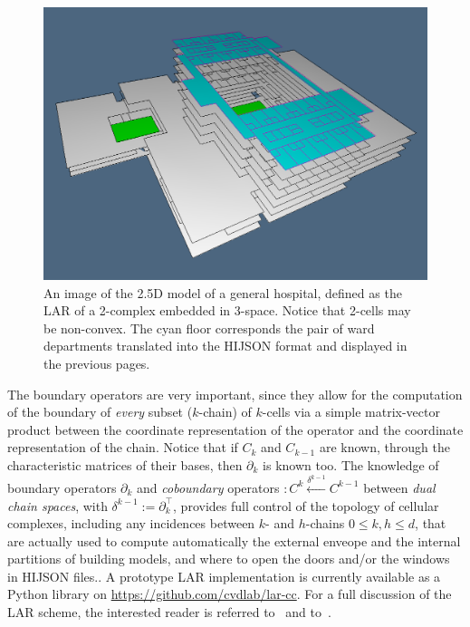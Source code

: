 \begin{figure}[ptb] %
 \centering
 \includegraphics[width=\linewidth]{images/hospital2} 
 \caption{An image of the 2.5D model of a general hospital, defined as the LAR of a 2-complex embedded in 3-space. Notice that 2-cells may be non-convex. The cyan floor corresponds the pair of ward departments translated into the HIJSON format and displayed in the previous pages.}
 \label{fig:hospital2}
\end{figure}

The boundary operators are very important, since they allow for the computation of the boundary of \emph{every} subset ($k$-chain) of $k$-cells via a simple matrix-vector product between the coordinate representation of the operator and the coordinate representation of the chain. Notice that if $C_k$ and $C_{k-1}$ are known, through the characteristic matrices of their bases, then $\partial_k$ is known too.
The knowledge of boundary operators $\partial_k$ and \emph{coboundary} operators $: C^{k} \xleftarrow{\delta^{k-1}} C^{k-1}$ between \emph{dual chain spaces}, with $\delta^{k-1} := \partial_k^\top$, provides full control of the topology of cellular complexes, including  any incidences between $k$- and $h$-chains $0\leq k,h\leq d$, that are actually used to compute automatically the external enveope and the internal partitions of building models, and where to open the doors and/or the windows in HIJSON files..
A prototype LAR implementation is currently available as a Python library on \href{https://github.com/cvdlab/lar-cc}{https://github.com/cvdlab/lar-cc}. For a full discussion of the LAR scheme, the interested reader is referred to~\cite{Dicarlo:2014:TNL:2543138.2543294} and to~\cite{paodcvjcadanda2015}.



